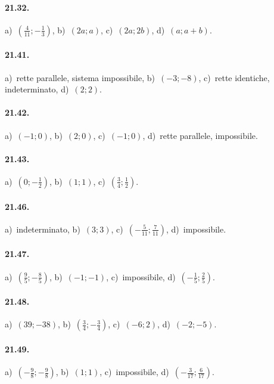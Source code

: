 \paragraph{21.32.} a)~$\left(\frac{4}{11};-\frac{1}{3}\right)$, \quad b)~$\left(2a;a\right)$, \quad c)~$\left(2a;2b\right)$, \quad d)~$\left(a;a+b\right)$.

\paragraph{21.41.} a)~rette parallele, sistema impossibile, \quad b)~$(-3;-8)$, \quad c)~rette identiche, indeterminato, \quad d)~$(2;2)$.

\paragraph{21.42.} a)~$\left(-1;0\right)$, \quad b)~$(2;0)$, \quad c)~$\left(-1;0\right)$, \quad d)~rette parallele, impossibile.

\paragraph{21.43.} a)~$\left(0;-\frac{1}{2}\right)$, \quad b)~$(1;1)$, \quad c)~$\left(\frac{3}{4};\frac{1}{2}\right)$.

\paragraph{21.46.} a)~indeterminato, \quad b)~$(3;3)$, \quad c)~$\left(-\frac{5}{11};\frac{7}{11}\right)$, \quad d)~impossibile.

\paragraph{21.47.} a)~$\left(\frac{9}{5};-\frac{8}{5}\right)$, \quad b)~$(-1;-1)$, \quad c)~impossibile, \quad d)~$\left(-\frac{1}{5};\frac{2}{5}\right)$.

\paragraph{21.48.} a)~$(39;-38)$, \quad b)~$\left(\frac{3}{4};-\frac{3}{4}\right)$, \quad c)~$(-6;2)$, \quad d)~$(-2;-5)$.

\paragraph{21.49.} a)~$\left(-\frac{9}{8};-\frac{9}{8}\right)$, \quad b)~$(1;1)$, \quad c)~impossibile, \quad d)~$\left(-\frac{3}{17};\frac{6}{17}\right)$.

